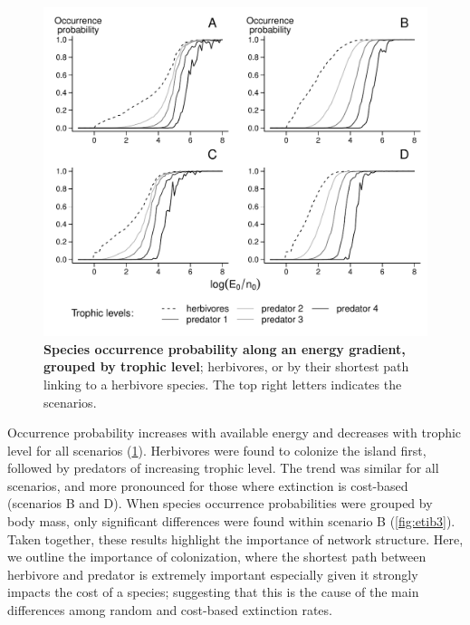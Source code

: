 \begin{figure}[htbp]
\centering
\includegraphics[width=\textwidth]{chapitre4/fig/fig2.pdf}
\caption[Species occurrence probability along an energy
gradient, grouped by trophic level]{\textbf{Species occurrence probability along an energy
gradient, grouped by trophic level}; herbivores, or by their shortest
path linking to a herbivore species. The top right letters indicates the
scenarios.\label{fig:etib2}}
\end{figure}


Occurrence probability increases with available energy and decreases
with trophic level for all scenarios (\ref{fig:etib2}). Herbivores were
found to colonize the island first, followed by predators of increasing
trophic level. The trend was similar for all scenarios, and more
pronounced for those where extinction is cost-based (scenarios B and D).
When species occurrence probabilities were grouped by body mass, only
significant differences were found within scenario B (\ref{fig:etib3}).
Taken together, these results highlight the importance of network
structure. Here, we outline the importance of colonization, where the
shortest path between herbivore and predator is extremely important
especially given it strongly impacts the cost of a species; suggesting
that this is the cause of the main differences among random and
cost-based extinction rates.


